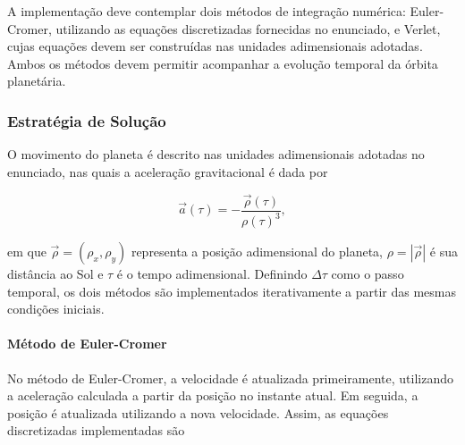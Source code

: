 \documentclass[12pt,a4paper]{article}
\begin{document}
A implementação deve contemplar dois métodos de integração numérica: Euler-Cromer, utilizando as equações discretizadas fornecidas no enunciado, e Verlet, cujas equações devem ser construídas nas unidades adimensionais adotadas. Ambos os métodos devem permitir acompanhar a evolução temporal da órbita planetária.

\subsubsection{Estratégia de Solução}

O movimento do planeta é descrito nas unidades adimensionais
adotadas no enunciado, nas quais a aceleração gravitacional é
dada por

\begin{equation}
    \vec{a}(\tau) =
    -\frac{\vec{\rho}(\tau)}{\rho(\tau)^3},
\end{equation}

em que $\vec{\rho}=(\rho_x,\rho_y)$ representa a posição
adimensional do planeta, $\rho=|\vec{\rho}|$ é sua distância
ao Sol e $\tau$ é o tempo adimensional. Definindo
$\Delta\tau$ como o passo temporal, os dois métodos são
implementados iterativamente a partir das mesmas condições
iniciais.

\paragraph{Método de Euler-Cromer}

No método de Euler-Cromer, a velocidade é atualizada
primeiramente, utilizando a aceleração calculada a partir
da posição no instante atual. Em seguida, a posição é
atualizada utilizando a nova velocidade. Assim, as equações
discretizadas implementadas são
\end{document}
